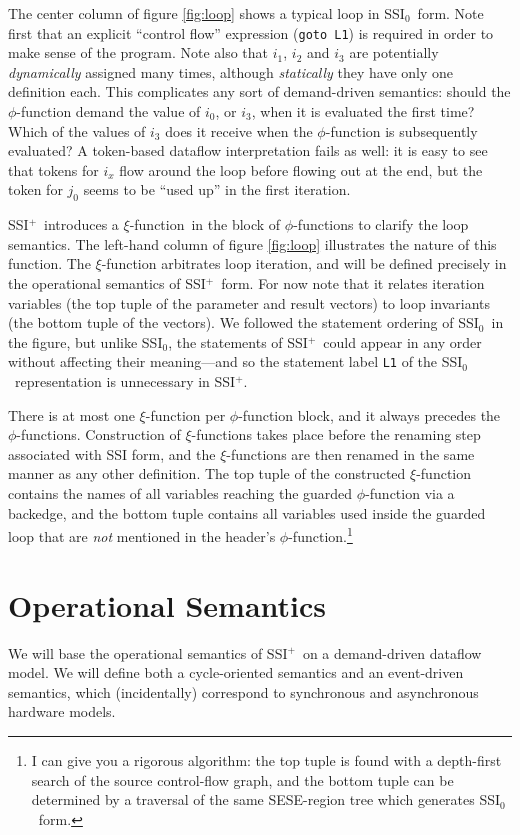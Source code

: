 \documentclass[12pt,notitlepage,twoside]{article}
\newcommand{\phifunction}{$\phi$-function}
\newcommand{\xifunction}{$\xi$-function}
\newcommand{\ssizero}{SSI$_0$}
\newcommand{\ssiplus}{SSI$^+$}
\begin{document}
The center column of figure \ref{fig:loop} shows a typical loop in
\ssizero\ form.  Note first that an explicit ``control flow''
expression (\texttt{goto L1}) is required in order to make sense of
the program.  Note also that $i_1$, $i_2$ and $i_3$ are potentially
\emph{dynamically} assigned many times, although \emph{statically}
they have only one definition each.  This complicates any sort of
demand-driven semantics: should the \phifunction{} demand the value of
$i_0$, or $i_3$, when it is evaluated the first time?  Which of the
values of $i_3$ does it receive when the \phifunction{} is
subsequently evaluated?  A token-based dataflow interpretation fails
as well: it is easy to see that tokens for $i_x$ flow around the loop
before flowing out at the end, but the token for $j_0$ seems to be
``used up'' in the first iteration.

\ssiplus\ introduces a \xifunction\ in the block of \phifunction{s} to
clarify the loop semantics. The left-hand column of figure
\ref{fig:loop} illustrates the nature of this function.  The
\xifunction{} arbitrates loop iteration, and will be defined precisely
in the operational semantics of \ssiplus\ form.  For now note that it
relates iteration variables (the top tuple of the parameter and result
vectors) to loop invariants (the bottom tuple of the vectors).  We
followed the statement ordering of \ssizero\ in the figure, but unlike
\ssizero, the statements of \ssiplus\ could appear in any order
without affecting their meaning---and so the statement label
\texttt{L1} of the \ssizero\ representation is unnecessary in \ssiplus.

There is at most one \xifunction{} per \phifunction{} block, and it
always precedes the \phifunction{s}.  Construction of \xifunction{s}
takes place before the renaming step associated with SSI form, and the
\xifunction{s} are then renamed in the same manner as any other
definition.  The top tuple of the constructed \xifunction{} contains
the names of all variables reaching the guarded \phifunction{} via a
backedge, and the bottom tuple contains all variables used inside the
guarded loop that are {\em not} mentioned in the header's
\phifunction{}.\footnote{I can give you a rigorous algorithm: the top
tuple is found with a depth-first search of the source
control-flow graph, and the bottom tuple can be determined by a
traversal of the same SESE-region tree which generates \ssizero\
form.}

\section{Operational Semantics}
We will base the operational semantics of \ssiplus\ on a demand-driven
dataflow model.  We will define both a cycle-oriented semantics and an
event-driven semantics, which (incidentally) correspond to synchronous
and asynchronous hardware models.
\end{document}
